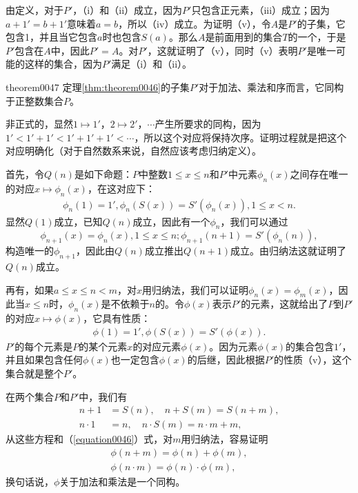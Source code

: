 由定义，对于$P'$，（i）和（ii）成立，因为$P'$只包含正元素，（iii）成立；因为$a+1'=b+1'$意味着$a=b$，所以（iv）成立。为证明（v），令$A$是$P'$的子集，它包含1，并且当它包含$a$时也包含$S(a)$。那么$A$是前面用到的集合$T$的一个，于是$P'$包含在$A$中，因此$P'=A$。对$P'$，这就证明了（v），同时（v）表明$P'$是唯一可能的这样的集合，因为$P'$满足（i）和（ii）。

\begin{theorem}{}{theorem0047}
定理\ref{thm:theorem0046}的子集$P'$对于加法、乘法和序而言，它同构于正整数集合$P$。
\end{theorem}

非正式的，显然$1 \mapsto 1'$，$2 \mapsto 2'$，$\cdots$产生所要求的同构，因为$1' < 1'+1' < 1'+1'+1' < \cdots$，所以这个对应将保持次序。证明过程就是把这个对应明确化（对于自然数系来说，自然应该考虑归纳定义）。

首先，令$Q(n)$是如下命题：$P$中整数$1 \le x \le n$和$P'$中元素$\phi_n(x)$之间存在唯一的对应$x \mapsto \phi_n(x)$，在这对应下：
\begin{gather}\label{equation0045}
\phi_n(1) = 1',\phi_n(S(x)) = S'(\phi_n(x)), 1 \le x < n.
\end{gather}
显然$Q(1)$成立，已知$Q(n)$成立，因此有一个$\phi_n$，我们可以通过
\[
\phi_{n+1}(x)=\phi_n(x), 1 \le x \le n; \phi_{n+1}(n+1) = S'(\phi_n(n)),
\]
构造唯一的$\phi_{n+1}$，因此由$Q(n)$成立推出$Q(n+1)$成立。由归纳法这就证明了$Q(n)$成立。

再有，如果$a \le x \le n < m$，对$x$用归纳法，我们可以证明$\phi_n(x) = \phi_m(x)$，因此当$x \le n$时，$\phi_n(x)$是不依赖于$n$的。令$\phi(x)$表示$P'$的元素，这就给出了$P$到$P'$的对应$x \mapsto \phi(x)$，它具有性质：
\begin{gather}\label{equation0046}
\phi(1)=1',\phi(S(x)) = S'(\phi(x)).
\end{gather}
$P'$的每个元素是$P$的某个元素$x$的对应元素$\phi(x)$。因为元素$\phi(x)$的集合包含$1'$，并且如果包含任何$\phi(x)$也一定包含$\phi(x)$的后继，因此根据$P'$的性质（v），这个集合就是整个$P'$。

在两个集合$P$和$P'$中，我们有
\begin{align}
n+1&=S(n), \quad n+S(m) = S(n+m), \label{equation0047}\\
n \cdot 1 &= n,\quad n \cdot S(m) = n \cdot m + m,\label{equation0048}
\end{align}
从这些方程和（\ref{equation0046}）式，对$m$用归纳法，容易证明
\[
\begin{aligned}
\phi(n+m)=\phi(n)+\phi(m),\\
\phi(n \cdot m) = \phi(n)\cdot\phi(m),
\end{aligned}
\]
换句话说，$\phi$关于加法和乘法是一个同构。

